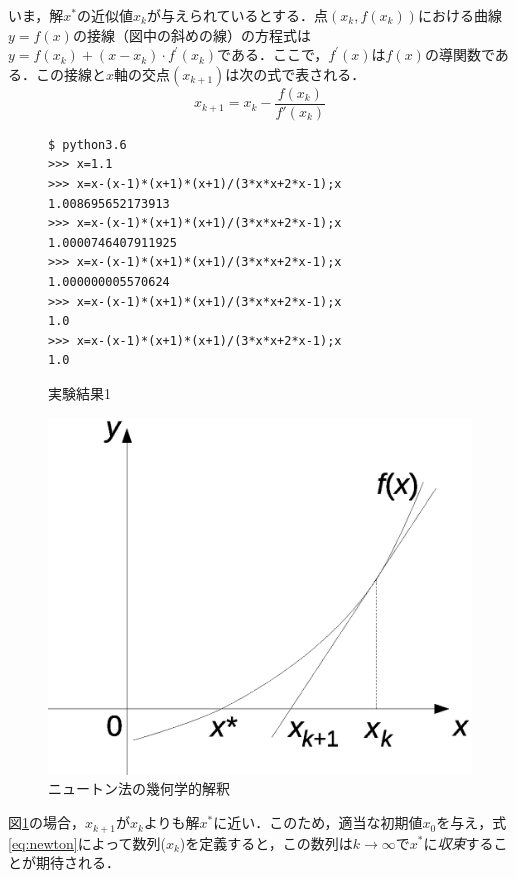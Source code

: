 \documentclass[a4j,11pt]{jarticle}
\begin{document}
いま，解$x^*$の近似値$x_k$が与えられているとする．点$(x_k,f(x_k))$における曲線$y=f(x)$の接線（図中の斜めの線）の方程式は$y=f(x_k)+(x-x_k)\cdot f^\prime(x_k)$である．ここで，$f^\prime(x)$は$f(x)$の導関数である．この接線と$x$軸の交点$(x_{k+1})$は次の式で表される\cite{author2,author3}．
\begin{equation}
x_{k+1}=x_k-\frac{f(x_k)}{f'(x_k)}
\label{eq:newton}
\end{equation}
\begin{figure}
\begin{minipage}[b]{210pt}
\center
\begin{verbatim}
$ python3.6
>>> x=1.1
>>> x=x-(x-1)*(x+1)*(x+1)/(3*x*x+2*x-1);x
1.008695652173913
>>> x=x-(x-1)*(x+1)*(x+1)/(3*x*x+2*x-1);x
1.0000746407911925
>>> x=x-(x-1)*(x+1)*(x+1)/(3*x*x+2*x-1);x
1.000000005570624
>>> x=x-(x-1)*(x+1)*(x+1)/(3*x*x+2*x-1);x
1.0
>>> x=x-(x-1)*(x+1)*(x+1)/(3*x*x+2*x-1);x
1.0
\end{verbatim}
\caption{実験結果1}
\label{result}
\end{minipage}
\begin{minipage}[b]{250pt}
\center
\includegraphics[scale=0.5]{figure3.eps}
\caption{ニュートン法の幾何学的解釈}
\label{fig:newton}
\end{minipage}
\end{figure}
図\ref{fig:newton}の場合，$x_{k+1}$が$x_k$よりも解$x^*$に近い．このため，適当な初期値$x_0$を与え，式\ref{eq:newton}によって数列($x_k$)を定義すると，この数列は$k\rightarrow \infty$で$x^*$に{\em 収束}することが期待される．
\end{document}
